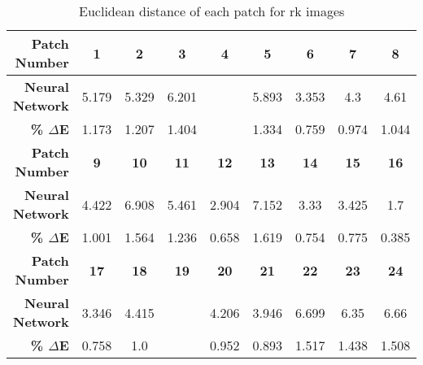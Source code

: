 \begin{table}[H]
  \caption{Euclidean distance of each patch for rk images }
  \begin{center}
    \begin{tabularx}{\textwidth}{r c c c c c c c c}
    \toprule
        \textbf{Patch Number} & \textbf{1} & \textbf{2} & \textbf{3} & \textbf{4} & \textbf{5} & \textbf{6} & \textbf{7} & \textbf{8}\\ \midrule 
        \textbf{Neural Network} &5.179 &5.329 &6.201 &\cellcolor{colorred}{7.442} &5.893 &3.353 &4.3 &4.61\\ 
        \textbf{\textbf{\% $\Delta$E}} &1.173 &1.207 &1.404 &\cellcolor{colorred}{1.685} &1.334 &0.759 &0.974 &1.044\\ \midrule 
        \textbf{Patch Number} & \textbf{9} & \textbf{10} & \textbf{11} & \textbf{12} & \textbf{13} & \textbf{14} & \textbf{15} & \textbf{16}\\ \midrule 
        \textbf{Neural Network} &4.422 &6.908 &5.461 &2.904 &7.152 &3.33 &3.425 &1.7\\ 
        \textbf{\textbf{\% $\Delta$E}} &1.001 &1.564 &1.236 &0.658 &1.619 &0.754 &0.775 &0.385\\ \midrule 
        \textbf{Patch Number} & \textbf{17} & \textbf{18} & \textbf{19} & \textbf{20} & \textbf{21} & \textbf{22} & \textbf{23} & \textbf{24}\\ \midrule 
        \textbf{Neural Network} &3.346 &4.415 &\cellcolor{colorgreen}{1.316} &4.206 &3.946 &6.699 &6.35 &6.66\\ 
        \textbf{\textbf{\% $\Delta$E}} &0.758 &1.0 &\cellcolor{colorgreen}{0.298} &0.952 &0.893 &1.517 &1.438 &1.508\\ \midrule 
    \bottomrule
    \end{tabularx}
  \end{center}
\end{table}

